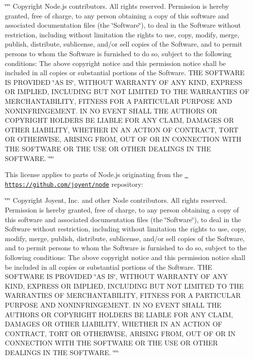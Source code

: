\begin{DoxyItemize}
\char`\"{}\char`\"{}\char`\"{}   Copyright Node.\+js contributors. All rights reserved.    Permission is hereby granted, free of charge, to any person obtaining a copy   of this software and associated documentation files (the \char`\"{}Software\char`\"{}), to   deal in the Software without restriction, including without limitation the   rights to use, copy, modify, merge, publish, distribute, sublicense, and/or   sell copies of the Software, and to permit persons to whom the Software is   furnished to do so, subject to the following conditions\+:    The above copyright notice and this permission notice shall be included in   all copies or substantial portions of the Software.    THE SOFTWARE IS PROVIDED \char`\"{}AS IS\char`\"{}, WITHOUT WARRANTY OF ANY KIND, EXPRESS OR   IMPLIED, INCLUDING BUT NOT LIMITED TO THE WARRANTIES OF MERCHANTABILITY,   FITNESS FOR A PARTICULAR PURPOSE AND NONINFRINGEMENT. IN NO EVENT SHALL THE   AUTHORS OR COPYRIGHT HOLDERS BE LIABLE FOR ANY CLAIM, DAMAGES OR OTHER   LIABILITY, WHETHER IN AN ACTION OF CONTRACT, TORT OR OTHERWISE, ARISING   FROM, OUT OF OR IN CONNECTION WITH THE SOFTWARE OR THE USE OR OTHER DEALINGS   IN THE SOFTWARE.   \char`\"{}\char`\"{}\char`\"{}

This license applies to parts of Node.\+js originating from the \href{https://github.com/joyent/node}{\texttt{ https\+://github.\+com/joyent/node}} repository\+:

\char`\"{}\char`\"{}\char`\"{}   Copyright Joyent, Inc. and other Node contributors. All rights reserved.   Permission is hereby granted, free of charge, to any person obtaining a copy   of this software and associated documentation files (the \char`\"{}Software\char`\"{}), to   deal in the Software without restriction, including without limitation the   rights to use, copy, modify, merge, publish, distribute, sublicense, and/or   sell copies of the Software, and to permit persons to whom the Software is   furnished to do so, subject to the following conditions\+:    The above copyright notice and this permission notice shall be included in   all copies or substantial portions of the Software.    THE SOFTWARE IS PROVIDED \char`\"{}AS IS\char`\"{}, WITHOUT WARRANTY OF ANY KIND, EXPRESS OR   IMPLIED, INCLUDING BUT NOT LIMITED TO THE WARRANTIES OF MERCHANTABILITY,   FITNESS FOR A PARTICULAR PURPOSE AND NONINFRINGEMENT. IN NO EVENT SHALL THE   AUTHORS OR COPYRIGHT HOLDERS BE LIABLE FOR ANY CLAIM, DAMAGES OR OTHER   LIABILITY, WHETHER IN AN ACTION OF CONTRACT, TORT OR OTHERWISE, ARISING   FROM, OUT OF OR IN CONNECTION WITH THE SOFTWARE OR THE USE OR OTHER DEALINGS   IN THE SOFTWARE.   \char`\"{}\char`\"{}\char`\"{} 
\end{DoxyItemize}